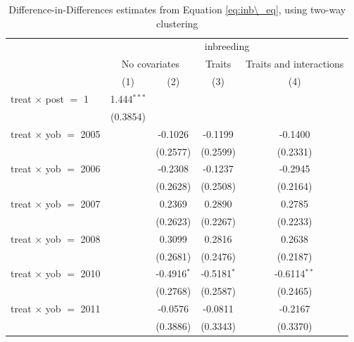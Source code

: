 
\begin{table}[htbp]
   \caption{\label{tab:table1c} Difference-in-Differences estimates from Equation \ref{eq:inb\_eq}, using two-way clustering}
   \bigskip
   \centering
   \begin{tabular}{lcccc}
      \toprule
       & \multicolumn{4}{c}{inbreeding}\\
       & \multicolumn{2}{c}{No covariates} & Traits & Traits and interactions \\ 
                                     & (1)           & (2)           & (3)           & (4)\\  
      \midrule 
      treat $\times$ post $=$ 1      & 1.444$^{***}$ &               &               &   \\   
                                     & (0.3854)      &               &               &   \\   
      treat $\times$ yob $=$ 2005    &               & -0.1026       & -0.1199       & -0.1400\\   
                                     &               & (0.2577)      & (0.2599)      & (0.2331)\\   
      treat $\times$ yob $=$ 2006    &               & -0.2308       & -0.1237       & -0.2945\\   
                                     &               & (0.2628)      & (0.2508)      & (0.2164)\\   
      treat $\times$ yob $=$ 2007    &               & 0.2369        & 0.2890        & 0.2785\\   
                                     &               & (0.2623)      & (0.2267)      & (0.2233)\\   
      treat $\times$ yob $=$ 2008    &               & 0.3099        & 0.2816        & 0.2638\\   
                                     &               & (0.2681)      & (0.2476)      & (0.2187)\\   
      treat $\times$ yob $=$ 2010    &               & -0.4916$^{*}$ & -0.5181$^{*}$ & -0.6114$^{**}$\\   
                                     &               & (0.2768)      & (0.2587)      & (0.2465)\\   
      treat $\times$ yob $=$ 2011    &               & -0.0576       & -0.0811       & -0.2167\\   
                                     &               & (0.3886)      & (0.3343)      & (0.3370)\\   

\end{tabular}
\end{table}
